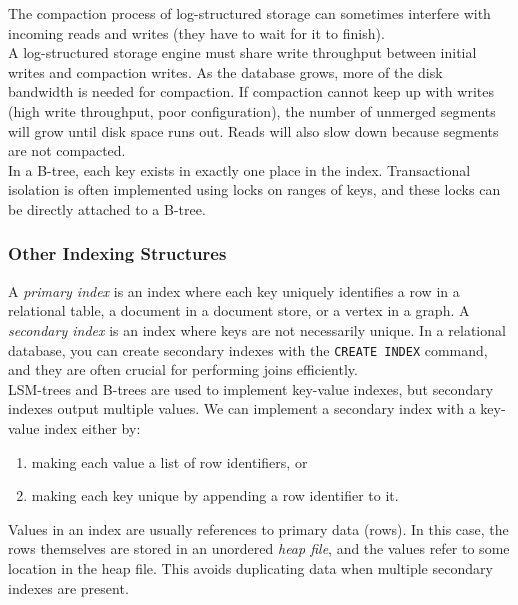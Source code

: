 \documentclass[12pt, titlepage]{article}
\begin{document}
The compaction process of log-structured storage can sometimes interfere with incoming reads and writes (they have to wait for it to finish). \\

A log-structured storage engine must share write throughput between initial writes and compaction writes. As the database grows, more of the disk bandwidth is needed for compaction. If compaction cannot keep up with writes (high write throughput, poor configuration), the number of unmerged segments will grow until disk space runs out. Reads will also slow down because segments are not compacted. \\

In a B-tree, each key exists in exactly one place in the index. Transactional isolation is often implemented using locks on ranges of keys, and these locks can be directly attached to a B-tree.

\subsubsection{Other Indexing Structures}

A \textit{primary index} is an index where each key uniquely identifies a row in a relational table, a document in a document store, or a vertex in a graph. A \textit{secondary index} is an index where keys are not necessarily unique. In a relational database, you can create secondary indexes with the \texttt{CREATE INDEX} command, and they are often crucial for performing joins efficiently. \\

LSM-trees and B-trees are used to implement key-value indexes, but secondary indexes output multiple values. We can implement a secondary index with a key-value index either by:

\begin{enumerate}
    \item making each value a list of row identifiers, or
    \item making each key unique by appending a row identifier to it.
\end{enumerate}

Values in an index are usually references to primary data (rows). In this case, the rows themselves are stored in an unordered \textit{heap file}, and the values refer to some location in the heap file. This avoids duplicating data when multiple secondary indexes are present. \\
\end{document}
